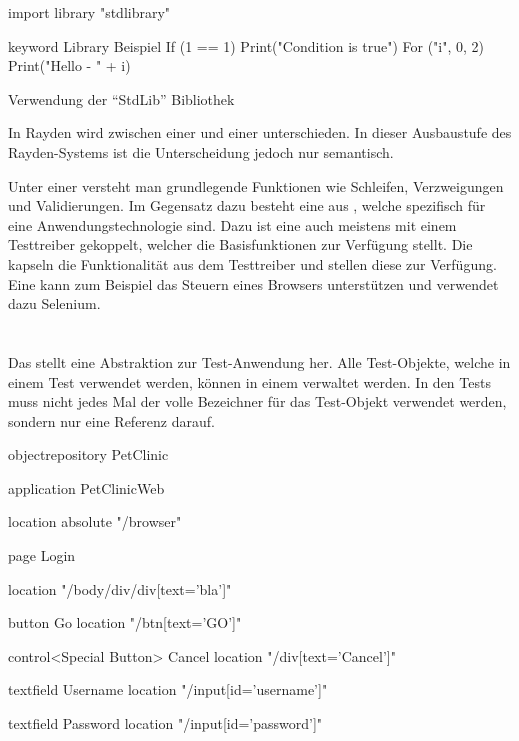 \begin{program}
\begin{JavaCode}
import library "stdlibrary"

keyword Library Beispiel {
	If (1 == 1){
		Print("Condition is true")
	}
	For ("i", 0, 2){
		Print("Hello - " + i)
	}
}
\end{JavaCode}
\caption{Verwendung der "`StdLib"' Bibliothek}
\label{prog:libraryUsage}
\end{program}

\SuperPar
In Rayden wird zwischen einer  und einer  unterschieden. In dieser Ausbaustufe des Rayden-Systems ist die Unterscheidung jedoch nur semantisch. 

\SuperPar
Unter einer  versteht man grundlegende Funktionen wie Schleifen, Verzweigungen und Validierungen. Im Gegensatz dazu besteht eine  aus , welche spezifisch für eine Anwendungstechnologie sind. Dazu ist eine  auch meistens mit einem Testtreiber gekoppelt, welcher die Basisfunktionen zur Verfügung stellt. Die  kapseln die Funktionalität aus dem Testtreiber und stellen diese zur Verfügung. Eine  kann zum Beispiel das Steuern eines Browsers unterstützen und verwendet dazu Selenium. 


\section{}

Das  stellt eine Abstraktion zur Test-Anwendung her. Alle Test-Objekte, welche in einem Test verwendet werden, können in einem  verwaltet werden. In den Tests muss nicht jedes Mal der volle Bezeichner für das Test-Objekt verwendet werden, sondern nur eine Referenz darauf. 

\begin{program}
\begin{JavaCode}

objectrepository PetClinic {

	application PetClinicWeb {
		location absolute "/browser"
		
		page Login {
			location "/body/div/div[text='bla']"
			
			button Go {
				location "/btn[text='GO']"
			}
			
			control<Special Button> Cancel {
				location "/div[text='Cancel']"
			}
		
			textfield Username {
				location  "/input[id='username']"
			}
			
			textfield Password {
				location  "/input[id='password']"
			}			
		} 
	}
}
\end{JavaCode}
\caption{}
\label{prog:or}
\end{program}


